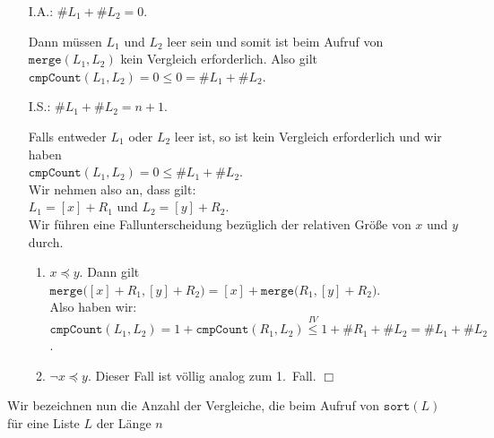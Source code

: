 \begin{enumerate}
\item[I.A.:] $\#L_1 + \#L_2=0$.

             Dann m\"ussen $L_1$ und $L_2$ leer sein und somit ist beim Aufruf
             von $\mathtt{merge}(L_1, L_2)$ kein Vergleich erforderlich.  Also gilt \\[0.1cm]
             \hspace*{1.3cm} $\mathtt{cmpCount}(L_1, L_2) = 0 \leq 0 = \#L_1 + \#L_2$.
\item[I.S.:] $\#L_1 + \#L_2 = n+1$.

             Falls entweder $L_1$ oder $L_2$ leer ist, so ist kein Vergleich erforderlich
             und wir haben 
             \\[0.1cm]
             \hspace*{1.3cm}
             $\mathtt{cmpCount}(L_1,L_2) = 0 \leq \#L_1 + \#L_2$.
             \\[0.1cm]
             Wir nehmen also an, dass gilt: \\[0.1cm]
             \hspace*{1.3cm} $L_1 = [x] + R_1$ \quad und \quad $L_2 = [y] + R_2$.
             \\[0.1cm]
             Wir f\"uhren eine Fallunterscheidung bez\"uglich der relativen Gr\"o{\ss}e von $x$ und $y$ 
             durch.
             \begin{enumerate}
             \item $x \preceq y$.  Dann gilt \\[0.1cm]
                   \hspace*{1.3cm} 
                   $\mathtt{merge}\bigl([x] + R_1, [y] + R_2\bigr) = [x] +
                   \mathtt{merge}\bigl(R_1, [y] + R_2\bigr)$. \\[0.1cm]
                   Also haben wir: \\[0.1cm]
                   \hspace*{1.3cm} 
                   $\mathtt{cmpCount}(L_1, L_2) = 1 + \mathtt{cmpCount}(R_1, L_2) \stackrel{IV}{\leq} 1 + \#R_1 + \#L_2 = \#L_1 + \#L_2$.
             \item $\neg x \preceq y$.  Dieser Fall ist v\"ollig analog zum 1.~Fall. \hspace*{\fill} $\Box$
             \end{enumerate}
\end{enumerate}
Wir bezeichnen nun die Anzahl der Vergleiche, die beim Aufruf von
$\mathtt{sort}(L)$ f\"ur eine Liste $L$ der L\"ange $n$
